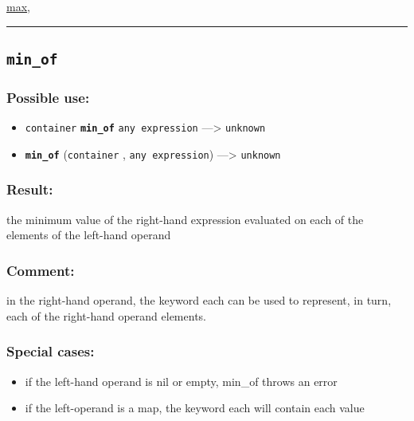 \documentclass[]{book}
\providecommand{\tightlist}{%
  \setlength{\itemsep}{0pt}\setlength{\parskip}{0pt}}
\theoremstyle{definition}
\theoremstyle{definition}
\theoremstyle{definition}
\theoremstyle{remark}
\begin{document}
\href{operators-i-to-m.html\#max}{max},

\begin{center}\rule{0.5\linewidth}{\linethickness}\end{center}

\subsection{\texorpdfstring{\texttt{min\_of}}{min\_of}}\label{min_of}

\subsubsection{Possible use:}\label{possible-use-352}

\begin{itemize}
\tightlist
\item
  \texttt{container} \textbf{\texttt{min\_of}} \texttt{any\ expression}
  ---\textgreater{} \texttt{unknown}
\item
  \textbf{\texttt{min\_of}} (\texttt{container} ,
  \texttt{any\ expression}) ---\textgreater{} \texttt{unknown}
\end{itemize}

\subsubsection{Result:}\label{result-341}

the minimum value of the right-hand expression evaluated on each of the
elements of the left-hand operand

\subsubsection{Comment:}\label{comment-71}

in the right-hand operand, the keyword each can be used to represent, in
turn, each of the right-hand operand elements.

\subsubsection{Special cases:}\label{special-cases-99}

\begin{itemize}
\tightlist
\item
  if the left-hand operand is nil or empty, min\_of throws an error\\
\item
  if the left-operand is a map, the keyword each will contain each value
\end{itemize}
\end{document}
